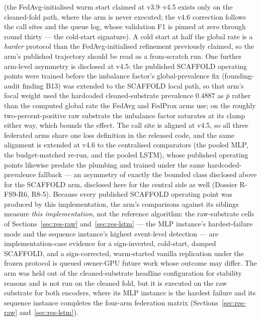 (the FedAvg-initialised warm start claimed at v3.9--v4.5 exists only
on the cleaned-fold path, where the arm is never executed; the v4.6
correction follows the call sites and the queue log, whose
validation F1 is pinned at zero through round thirty --- the
cold-start signature). A cold start at half the global rate is a
\emph{harder} protocol than the FedAvg-initialised refinement
previously claimed, so the arm's published trajectory should be read
as a from-scratch run. One further arm-level asymmetry is disclosed
at v4.5: the published SCAFFOLD operating points were trained before
the imbalance factor's global-prevalence fix (founding-audit finding
B13) was extended to the SCAFFOLD local path, so that arm's focal
weight used the hardcoded cleaned-substrate prevalence $0.4887$ as
$\bar{p}$ rather than the computed global rate the FedAvg and
FedProx arms use; on the roughly two-percent-positive raw substrate
the imbalance factor saturates at its clamp either way, which bounds
the effect. The call site is aligned at v4.5, so all three federated
arms share one loss definition in the released code, and the same
alignment is extended at v4.6 to the centralised comparators (the
pooled MLP, the budget-matched re-run, and the pooled LSTM), whose
published operating points likewise predate the plumbing and trained
under the same hardcoded-prevalence fallback --- an asymmetry of
exactly the bounded class disclosed above for the SCAFFOLD arm,
disclosed here for the central side as well (Dossier R-FS9-R6,
R8-5). Because every
published SCAFFOLD operating point was produced by this
implementation, the arm's comparisons against its siblings measure
\emph{this implementation}, not the reference algorithm: the
raw-substrate cells of Sections~\ref{sec:res-raw}
and~\ref{sec:res-lstm} --- the MLP instance's hardest-failure mode
and the sequence instance's highest event-level detection --- are
implementation-case evidence for a sign-inverted, cold-start,
damped SCAFFOLD, and a sign-corrected, warm-started vanilla
replication under the frozen protocol is queued owner-GPU future
work whose outcome may differ. The arm was held out of the
cleaned-substrate headline configuration for stability reasons and
is not run on the cleaned fold, but it is executed on the raw
substrate for both encoders, where its MLP instance is the hardest
failure and its sequence instance completes the four-arm federation
matrix (Sections~\ref{sec:res-raw} and~\ref{sec:res-lstm}).

